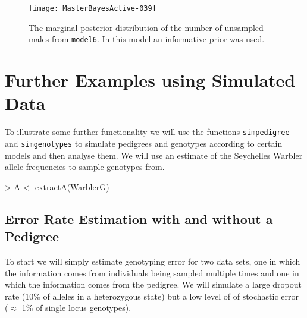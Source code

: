 \documentclass{article}
\begin{document}
\begin{figure}[!h]
\begin{center}
\texttt{[image: MasterBayesActive-039]}
\end{center}
\caption{The marginal posterior distribution of the number of unsampled males from \texttt{model6}. In this model an informative prior was used.}
\label{model6US-fig}
\end{figure}

\section{\large{Further Examples using Simulated Data}}

To illustrate some further functionality we will use the functions \texttt{simpedigree} and \texttt{simgenotypes} to simulate pedigrees and genotypes according to certain models and then analyse them. We will use an estimate of the Seychelles Warbler allele frequencies to sample genotypes from.

\begin{Schunk}
\begin{Sinput}
> A <- extractA(WarblerG)
\end{Sinput}
\end{Schunk}

\subsection{Error Rate Estimation with and without a Pedigree}
\label{Error-sec}

 To start we will simply estimate genotyping error for two data sets, one in which the information comes from individuals being sampled multiple times and one in which the information comes from the pedigree.  We will simulate a large dropout rate (10\% of alleles in a heterozygous state) but a low level of of stochastic error  ($\approx$ 1\% of single locus genotypes).
\end{document}
